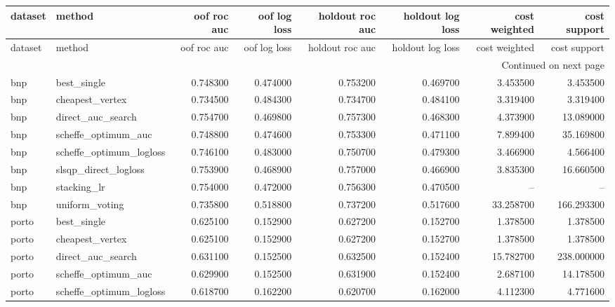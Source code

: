 \begin{center}\label{tab:s2refs}\end{center}
\begingroup\scriptsize\setlength{\tabcolsep}{2.5pt}
\begin{longtable}{llrrrrrr}
\toprule
dataset & method & oof roc auc & oof log loss & holdout roc auc & holdout log loss & cost weighted & cost support \\
\midrule
\endfirsthead
\toprule
dataset & method & oof roc auc & oof log loss & holdout roc auc & holdout log loss & cost weighted & cost support \\
\midrule
\endhead
\midrule
\multicolumn{8}{r}{Continued on next page} \\
\midrule
\endfoot
\bottomrule
\endlastfoot
bnp & best\_single & 0.748300 & 0.474000 & 0.753200 & 0.469700 & 3.453500 & 3.453500 \\
bnp & cheapest\_vertex & 0.734500 & 0.484300 & 0.734700 & 0.484100 & 3.319400 & 3.319400 \\
bnp & direct\_auc\_search & 0.754700 & 0.469800 & 0.757300 & 0.468300 & 4.373900 & 13.089000 \\
bnp & scheffe\_optimum\_auc & 0.748800 & 0.474600 & 0.753300 & 0.471100 & 7.899400 & 35.169800 \\
bnp & scheffe\_optimum\_logloss & 0.746100 & 0.483000 & 0.750700 & 0.479300 & 3.466900 & 4.566400 \\
bnp & slsqp\_direct\_logloss & 0.753900 & 0.468900 & 0.757000 & 0.466900 & 3.835300 & 16.660500 \\
bnp & stacking\_lr & 0.754000 & 0.472000 & 0.756300 & 0.470500 & -- & -- \\
bnp & uniform\_voting & 0.735800 & 0.518800 & 0.737200 & 0.517600 & 33.258700 & 166.293300 \\
porto & best\_single & 0.625100 & 0.152900 & 0.627200 & 0.152700 & 1.378500 & 1.378500 \\
porto & cheapest\_vertex & 0.625100 & 0.152900 & 0.627200 & 0.152700 & 1.378500 & 1.378500 \\
porto & direct\_auc\_search & 0.631100 & 0.152500 & 0.632500 & 0.152400 & 15.782700 & 238.000000 \\
porto & scheffe\_optimum\_auc & 0.629900 & 0.152500 & 0.631900 & 0.152400 & 2.687100 & 14.178500 \\
porto & scheffe\_optimum\_logloss & 0.618700 & 0.162200 & 0.620700 & 0.162000 & 4.112300 & 4.771600 \\

\end{longtable}
